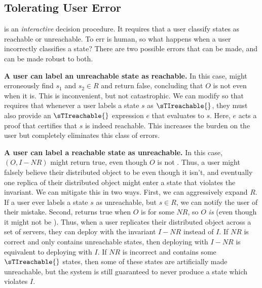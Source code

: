 \subsection{Tolerating User Error}
 is an \emph{interactive} decision
procedure. It requires that a user classify states as reachable or unreachable.
To err is human, so what happens when a user incorrectly classifies a state?
There are two possible errors that can be made, and
 can be made robust to both.

\textbf{A user can label an unreachable state as reachable.}
In this case, \Helper{} might erroneously find $s_1$ and $s_2 \in R$ and return
false, concluding that $O$ is not \sTIconfluent{} even when it is.  This is
inconvenient, but not catastrophic. We can modify
 so that \Helper{} requires that whenever
a user labels a state $s$ as $\sTIreachable{}$, they must also provide an
$\sTIreachable{}$ expression $e$ that evaluates to $s$. Here, $e$ acts a proof
that certifies that $s$ is indeed reachable. This increases the burden on the
user but completely eliminates this class of errors.

\textbf{A user can label a reachable state as unreachable.}
In this case, \IsIclosed$(O, I - NR)$ might return true, even though $O$ is not
\sTIconfluent. Thus, a user might falsely believe their distributed object to
be \sTIconfluent{} even though it isn't, and eventually one replica of their
distributed object might enter a state that violates the invariant.
%
We can mitigate this in two ways. First, we can aggressively expand $R$. If a
user ever labels a state $s$ as unreachable, but $s \in R$, we can notify the
user of their mistake. Second, \Helper{} returns true when $O$ is  for some $NR$, so $O$ \emph{is}  (even though
it might not be \sTIconfluent{}). Thus, when a user replicates their
distributed object across a set of servers, they can deploy with the invariant
$I - NR$ instead of $I$. If $NR$ is correct and only contains unreachable
states, then deploying with $I - NR$ is equivalent to deploying with $I$. If
$NR$ is incorrect and contains some $\sTIreachable{}$ states, then some of
these states are artificially made unreachable, but the system is still
guaranteed to never produce a state which violates $I$.

{}
